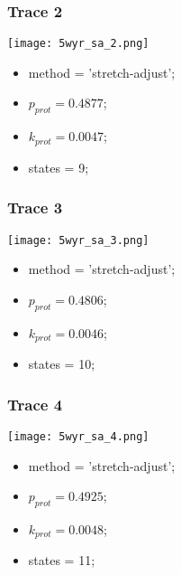 \subsubsection{Trace 2}
\begin{minipage}[c]{0.7\textwidth}
    \texttt{[image: 5wyr\_sa\_2.png]}
\end{minipage}
\hfill
\begin{minipage}[c]{0.45\textwidth}
    \begin{itemize}
        \item method = 'stretch-adjust';
        \item $p_{prot}=0.4877$;
        \item $k_{prot}=0.0047$;
        \item states = 9;
    \end{itemize}
\end{minipage}

\subsubsection{Trace 3}
\begin{minipage}[c]{0.7\textwidth}
    \texttt{[image: 5wyr\_sa\_3.png]}
\end{minipage}
\hfill
\begin{minipage}[c]{0.45\textwidth}
    \begin{itemize}
        \item method = 'stretch-adjust';
        \item $p_{prot}=0.4806$;
        \item $k_{prot}=0.0046$;
        \item states = 10;
    \end{itemize}
\end{minipage}

\subsubsection{Trace 4}
\begin{minipage}[c]{0.7\textwidth}
    \texttt{[image: 5wyr\_sa\_4.png]}
\end{minipage}
\hfill
\begin{minipage}[c]{0.45\textwidth}
    \begin{itemize}
        \item method = 'stretch-adjust';
        \item $p_{prot}=0.4925$;
        \item $k_{prot}=0.0048$;
        \item states = 11;
    \end{itemize}
\end{minipage}

